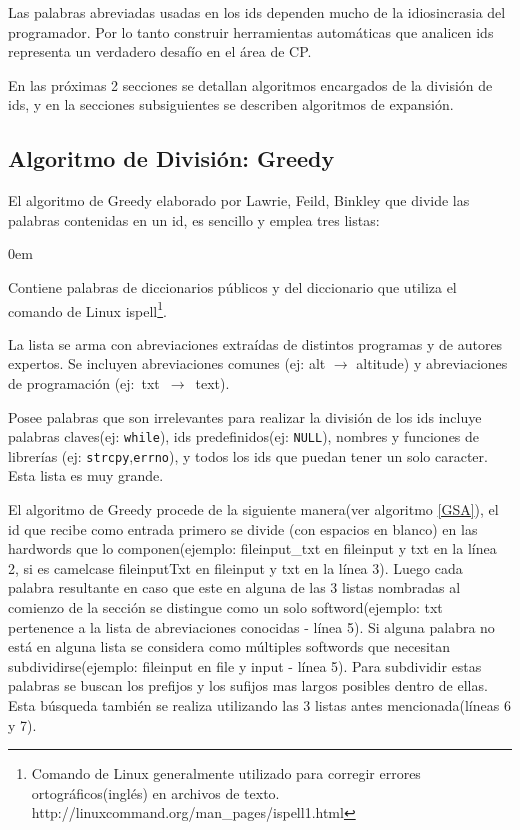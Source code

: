 \documentclass[a4paper,12pt]{report}
\begin{document}
Las palabras abreviadas usadas en los ids dependen mucho de la idiosincrasia del programador. Por lo tanto construir herramientas automáticas que analicen ids representa un verdadero desafío en el área de CP.

En las próximas 2 secciones se detallan algoritmos encargados de la división de ids, y en la secciones subsiguientes se describen algoritmos de expansión.


\subsection{Algoritmo de División: Greedy}

El algoritmo de Greedy elaborado por Lawrie, Feild, Binkley\cite{DLFB06,FBL06,HDD06,LFBEX07,EHPV09} que divide las palabras contenidas en un id, es sencillo y emplea tres listas:
\begin{description}
\itemsep0em%
\item[Palabras de diccionarios:] Contiene palabras de diccionarios públicos y del diccionario que utiliza el comando de Linux \textsf{ispell}\footnote[1]{Comando de Linux generalmente utilizado para corregir errores ortográficos(inglés) en archivos de texto. http://linuxcommand.org/man\_pages/ispell1.html}.

\item[Abreviaciones conocidas:] La lista se arma con abreviaciones extraídas de distintos programas y de autores expertos. Se incluyen abreviaciones comunes (ej: \textsf{alt} $\rightarrow$ \textsf{altitude}) y abreviaciones de programación \mbox{(ej: \textsf{txt} $\rightarrow$ \textsf{text}).}

\item[Palabras excluyentes(stop list):] Posee palabras que son irrelevantes para realizar la división de los ids incluye palabras claves(ej: \texttt{while}), ids predefinidos(ej: \texttt{NULL}), nombres y funciones de librerías (ej: \texttt{strcpy},\texttt{errno}), y todos los ids que puedan tener un solo caracter. Esta lista es muy grande.
\end{description}

El algoritmo de Greedy procede de la siguiente manera(ver algoritmo \ref{GSA}), el id que recibe como entrada primero se divide (con espacios en blanco) en las hardwords que lo componen(ejemplo: \textsf{fileinput\_txt} en \textsf{fileinput} y \textsf{txt} en la línea 2, si es camelcase \textsf{fileinputTxt} en \textsf{fileinput} y \textsf{txt} en la línea 3). Luego cada palabra resultante en caso que este en alguna de las 3 listas nombradas al comienzo de la sección se distingue como un solo softword(ejemplo: \textsf{txt} pertenence a la lista de abreviaciones conocidas - línea 5). Si alguna palabra no está en alguna lista se considera como múltiples softwords que necesitan subdividirse(ejemplo: \textsf{fileinput} en \textsf{file} y \textsf{input} - línea 5). Para subdividir estas palabras se buscan los prefijos y los sufijos mas largos posibles dentro de ellas. Esta búsqueda también se realiza utilizando las 3 listas antes mencionada(líneas 6 y 7).
\end{document}
